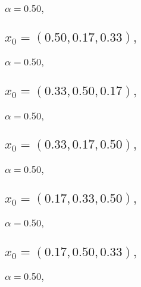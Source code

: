 \documentclass[a4paper]{article}
\begin{document}
\begin{multicols*}{2}
   \subsubsection{\(\alpha = 0.50,\quad \)}
   

   \subsection{\(x_0 = (0.50,0.17,0.33),\quad \)}
   

   \subsubsection{\(\alpha = 0.50,\quad \)}
   

   \subsection{\(x_0 = (0.33,0.50,0.17),\quad \)}
   

   \subsubsection{\(\alpha = 0.50,\quad \)}
   

   \subsection{\(x_0 = (0.33,0.17,0.50),\quad \)}
   

   \subsubsection{\(\alpha = 0.50,\quad \)}
   

   \subsection{\(x_0 = (0.17,0.33,0.50),\quad \)}
   

   \subsubsection{\(\alpha = 0.50,\quad \)}
   

   \subsection{\(x_0 = (0.17,0.50,0.33),\quad \)}
   

   \subsubsection{\(\alpha = 0.50,\quad \)}
   


\end{multicols*}
\end{document}
